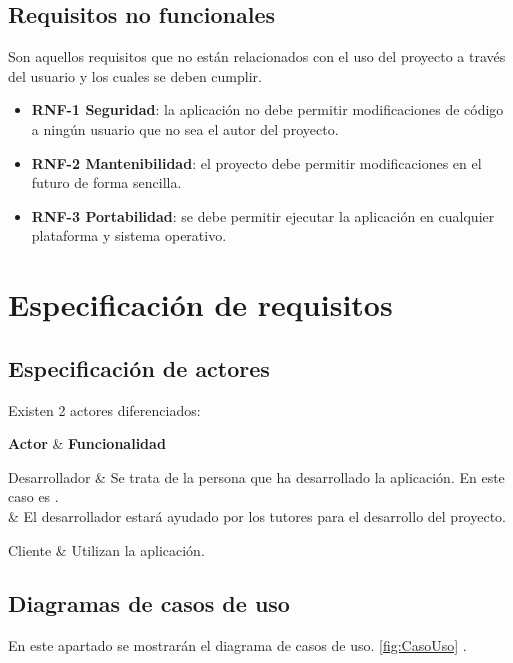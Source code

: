 \subsection{Requisitos no funcionales}
Son aquellos requisitos que no están relacionados con el uso del proyecto a través del usuario y los cuales se deben cumplir.

\begin{itemize}
    \item \textbf{RNF-1 Seguridad}: la aplicación no debe permitir modificaciones de código a ningún usuario que no sea el autor del proyecto.
    \item \textbf{RNF-2 Mantenibilidad}: el proyecto debe permitir modificaciones en el futuro de forma sencilla.
    \item \textbf{RNF-3 Portabilidad}: se debe permitir ejecutar la aplicación en cualquier plataforma y sistema operativo.
\end{itemize}

\section{Especificación de requisitos}

\subsection{Especificación de actores}
Existen 2 actores diferenciados:

{\textbf{Actor} & \textbf{Funcionalidad} \\}{
	Desarrollador & Se trata de la persona que ha desarrollado la aplicación. En este caso es \nombre. \\
	& El desarrollador estará ayudado por los tutores \nombreTutores para el desarrollo del proyecto. \\ \hline
	
	Cliente & Utilizan la aplicación. \\
}

\subsection{Diagramas de casos de uso}
En este apartado se mostrarán el diagrama de casos de uso. \ref{fig:CasoUso} \cite{wiki:casosDeUso}.


